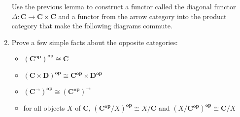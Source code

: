 \documentclass{scrartcl}
\newcommand{\Cat}[1]{\mathbf{#1}}
\newcommand{\Op}[1]{#1^{\mathbf{op}}}
\newcommand{\Arr}[1]{#1^{\rightarrow}}
\newcommand{\iso}[0]{\cong}
\begin{document}
\begin{enumerate}
  Use the previous lemma to construct a functor called the diagonal functor $\Delta: \Cat{C} \rightarrow \Cat{C} \times \Cat{C}$ and a functor from the arrow category into the product category that make the following diagrams commute.
  \begin{center}
  \end{center}
 
\item
  Prove a few simple facts about the opposite categories:
  \begin{itemize}
  \item $\Op{(\Op{\Cat{C}})} \iso \Cat{C}$
  \item $\Op{(\Cat{C} \times \Cat{D})} \iso \Op{\Cat{C}} \times \Op{\Cat{D}}$
  \item $\Op{(\Arr{\Cat{C}})} \iso \Arr{(\Op{\Cat{C}})}$
  \item for all objects $X$ of $\Cat{C}$, $\Op{(\Op{\Cat{C}}/X)} \iso X/\Cat{C}$ and $\Op{(X/\Op{\Cat{C}})} \iso \Cat{C}/X$
  \end{itemize}

\end{enumerate}

\end{document}
